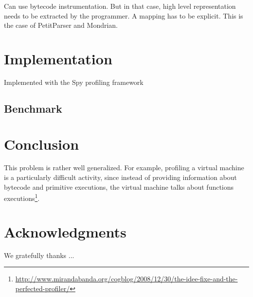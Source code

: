 \documentclass[runningheads]{llncs}
\newcommand{\seclabel}[1]{\label{sec:#1}}
\begin{document}
Can use bytecode instrumentation. But in that case, high level representation needs to be extracted by the programmer. A mapping has to be explicit. This is the case of PetitParser and Mondrian.




\section{Implementation}\seclabel{implementation}

Implemented with the Spy profiling framework

\subsection{Benchmark}	
	
\section{Conclusion}\seclabel{conclusion}

This problem is rather well generalized. For example, profiling a virtual machine is a particularly difficult activity, since instead of providing information about bytecode and primitive executions, the virtual machine talks about functions executions\footnote{\url{http://www.mirandabanda.org/cogblog/2008/12/30/the-idee-fixe-and-the-perfected-profiler/}}.

\section*{Acknowledgments}

\small We gratefully thanks ...



\end{document}
